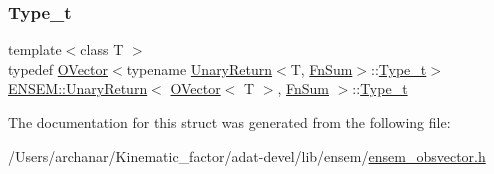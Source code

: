 \mbox{\label{structENSEM_1_1UnaryReturn_3_01OVector_3_01T_01_4_00_01FnSum_01_4_aeade0fc333784b1705f2ab3348b5fed1}} 
\subsubsection{\texorpdfstring{Type\_t}{Type\_t}\hspace{0.1cm}{\footnotesize\ttfamily [3/3]}}
{\footnotesize\ttfamily template$<$class T $>$ \\
typedef \mbox{\hyperlink{classENSEM_1_1OVector}{O\+Vector}}$<$typename \mbox{\hyperlink{structENSEM_1_1UnaryReturn}{Unary\+Return}}$<$T, \mbox{\hyperlink{structENSEM_1_1FnSum}{Fn\+Sum}}$>$\+::\mbox{\hyperlink{structENSEM_1_1UnaryReturn_3_01OVector_3_01T_01_4_00_01FnSum_01_4_aeade0fc333784b1705f2ab3348b5fed1}{Type\+\_\+t}}$>$ \mbox{\hyperlink{structENSEM_1_1UnaryReturn}{E\+N\+S\+E\+M\+::\+Unary\+Return}}$<$ \mbox{\hyperlink{classENSEM_1_1OVector}{O\+Vector}}$<$ T $>$, \mbox{\hyperlink{structENSEM_1_1FnSum}{Fn\+Sum}} $>$\+::\mbox{\hyperlink{structENSEM_1_1UnaryReturn_3_01OVector_3_01T_01_4_00_01FnSum_01_4_aeade0fc333784b1705f2ab3348b5fed1}{Type\+\_\+t}}}



The documentation for this struct was generated from the following file\+:\begin{DoxyCompactItemize}
\item 
/\+Users/archanar/\+Kinematic\+\_\+factor/adat-\/devel/lib/ensem/\mbox{\hyperlink{adat-devel_2lib_2ensem_2ensem__obsvector_8h}{ensem\+\_\+obsvector.\+h}}\end{DoxyCompactItemize}
